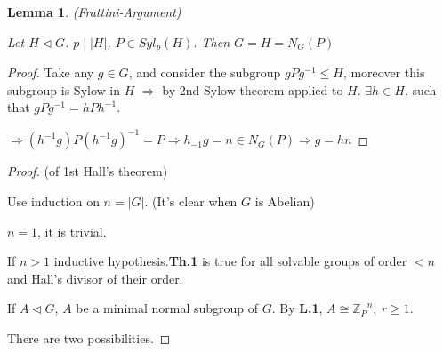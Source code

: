 \documentclass[12pt, a4paper]{article}
\newcounter{lemmacounter}
\newtheorem{lemma}[lemmacounter]{Lemma}
\theoremstyle{definition}
\begin{document}
\begin{lemma}
    (Frattini-Argument)
    \par
    Let $H\lhd G $. $p\mid |H| $, $P\in Syl_p(H)$. Then $G=H=N_G(P) $
\end{lemma}
\begin{proof}
    Take any $g\in G $, and consider the subgroup $gPg^{-1} \leqslant H $, moreover this 
    subgroup is Sylow in $H$ $\Rightarrow$ by 2nd Sylow theorem applied to $H$. $\exists h\in 
    H$, such that $gPg^{-1} = hPh^{-1} $.
    \par
    $\Rightarrow (h^{-1}g)P{(h^{-1}g)}^{-1} = P \Rightarrow h_{-1}g = n\in N_G(P) \Rightarrow 
    g =hn$
    \par
\end{proof}
\begin{proof}
    (of 1st Hall's theorem)
    \par
    Use induction on $n=|G| $. (It's clear when $G$ is Abelian)
    \par
    $n=1 $, it is trivial.
    \par
    If $n>1 $ inductive hypothesis.\textbf{Th.1} is true for all solvable groups of order 
    $<n $ and Hall's divisor of their order.
    \par
    If $A\lhd G $, $A$ be a minimal normal subgroup of $G$. By \textbf{L.1}, $A\cong 
    {\mathbb{Z}_P}^n,\ r\geqslant 1 $.
    \par
    There are two possibilities.
\end{proof}
\end{document}
